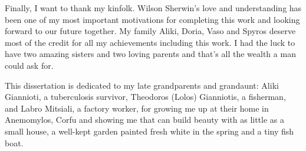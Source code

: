 Finally, I want to thank my kinfolk. Wilson Sherwin's love and understanding has been one of my
most important motivations for completing this work and looking forward to our future together.
My family Aliki, Doria, Vaso and Spyros deserve most of the credit for all my achievements including
this work. I had the luck to have two amazing sisters and two loving parents and that's all the wealth 
a man could ask for. 

This dissertation is dedicated to my late grandparents and grandaunt: 
Aliki Giannioti, a tuberculosis survivor, Theodoros (Lolos) Gianniotis, a fisherman, and
Labro Mitsiali, a factory  worker, for growing me up at their home in Anemomylos, Corfu and showing me that can build beauty with as little as
a small house, a well-kept garden painted fresh white in the spring and a tiny fish 
boat.


